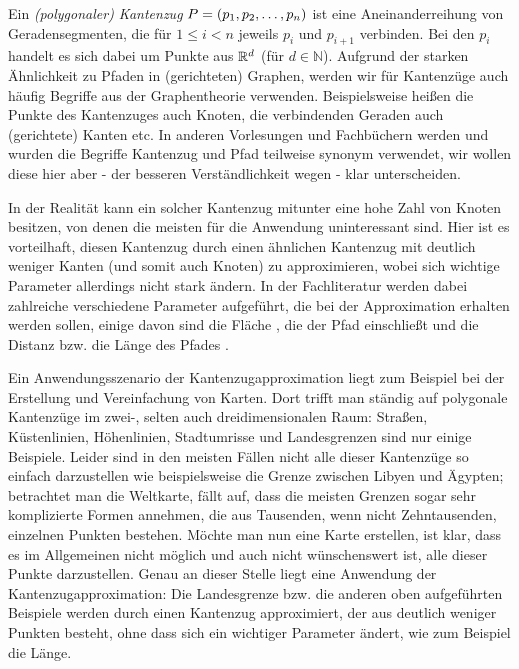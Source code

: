 	Ein \emph{(polygonaler) Kantenzug} $P = (p_1, p_2, \mathellipsis, p_n)$ ist eine Aneinanderreihung von Geradensegmenten, die für $1 \leq i < n$ jeweils $p_i$ und $p_{i+1}$ verbinden. 
	Bei den $p_i$ handelt es sich dabei um Punkte aus $\mathbb{R}^d$ (für $d \in \mathbb{N}$). Aufgrund der starken Ähnlichkeit zu Pfaden in (gerichteten) Graphen, werden wir für Kantenzüge auch häufig Begriffe aus der Graphentheorie verwenden. 
	Beispielsweise heißen die Punkte des Kantenzuges auch Knoten, die verbindenden Geraden auch (gerichtete) Kanten etc.
	In anderen Vorlesungen und Fachbüchern werden und wurden die Begriffe Kantenzug und Pfad teilweise synonym verwendet, wir wollen diese hier aber - der besseren Verständlichkeit wegen -  klar unterscheiden.

    In der Realität kann ein solcher Kantenzug mitunter eine hohe Zahl von Knoten besitzen, von denen die meisten für die Anwendung uninteressant sind. 
    Hier ist es vorteilhaft, diesen Kantenzug durch einen ähnlichen Kantenzug mit deutlich weniger Kanten (und somit auch Knoten) zu approximieren, wobei sich wichtige Parameter allerdings nicht stark ändern. 
    In der Fachliteratur werden dabei zahlreiche verschiedene Parameter aufgeführt, die bei der Approximation erhalten werden sollen, einige davon sind die Fläche \cite{bose}, die der Pfad einschließt und die Distanz bzw. die Länge des Pfades \cite{gudmundsson}. 
    
    Ein Anwendungsszenario der Kantenzugapproximation liegt zum Beispiel bei der Erstellung und Vereinfachung von Karten. 
    Dort trifft man ständig auf polygonale Kantenzüge im \mbox{zwei-,} selten auch dreidimensionalen Raum: Straßen, Küstenlinien, Höhenlinien, Stadtumrisse und Landesgrenzen sind nur einige Beispiele. 
    Leider sind in den meisten Fällen nicht alle dieser Kantenzüge so einfach darzustellen wie beispielsweise die Grenze zwischen Libyen und Ägypten; betrachtet man die Weltkarte, fällt auf, dass die meisten Grenzen sogar sehr komplizierte Formen annehmen, die aus Tausenden, wenn nicht Zehntausenden, einzelnen Punkten bestehen.
    Möchte man nun eine Karte erstellen, ist klar, dass es im Allgemeinen nicht möglich und auch nicht wünschenswert ist, alle dieser Punkte darzustellen. 
    Genau an dieser Stelle liegt eine Anwendung der Kantenzugapproximation: Die Landesgrenze bzw. die anderen oben aufgeführten Beispiele werden durch einen Kantenzug approximiert, der aus deutlich weniger Punkten besteht, ohne dass sich ein wichtiger Parameter ändert, wie zum Beispiel die Länge.
    
